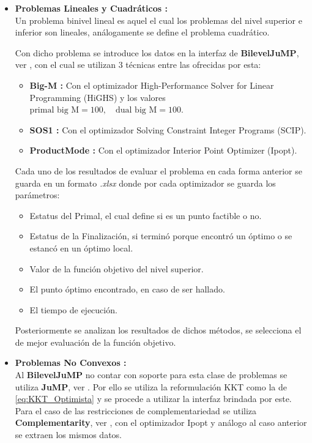 \begin{itemize}
    \item \textbf{Problemas Lineales y Cuadráticos :}\\
            Un problema binivel lineal es aquel el cual los problemas del nivel superior e inferior son lineales, análogamente se define el problema cuadrático.
            
            Con dicho problema se introduce los datos en la interfaz de \textbf{BilevelJuMP}, ver \cite{BilevelJump}, con el cual se utilizan 3 técnicas entre las ofrecidas por esta:
            \begin{itemize}
                \item \textbf{Big-M :} Con el optimizador High-Performance Solver for Linear Programming (HiGHS) y los valores $\text{primal big M} = 100, \quad \text{dual big M} = 100$.
                \item \textbf{SOS1 :} Con el optimizador Solving Constraint Integer Programs (SCIP).
                \item \textbf{ProductMode :} Con el optimizador Interior Point Optimizer (Ipopt).
            \end{itemize} 
            Cada uno de los resultados de evaluar el problema en cada forma anterior se guarda en un formato \textit{.xlsx}
            donde por cada optimizador se guarda los parámetros:
            \begin{itemize}
                \item Estatus del Primal, el cual define si es un punto factible o no.
                \item Estatus de la Finalización, si terminó porque encontró un óptimo o se estancó en un óptimo local.
                \item Valor de la función objetivo del nivel superior.
                \item El punto óptimo encontrado, en caso de ser hallado.
                \item El tiempo de ejecución.
            \end{itemize} 
            Posteriormente se analizan los resultados de dichos métodos, se selecciona el de mejor evaluación de la función objetivo.
    \item \textbf{Problemas No Convexos :}\\
            Al \textbf{BilevelJuMP} no contar con soporte para esta clase de problemas se utiliza \textbf{JuMP}, ver \cite{JuMPPaper}.
            Por ello se utiliza la reformulación KKT como la de \ref{eq:KKT_Optimista} y se procede a utilizar la interfaz brindada por este. Para el caso de las restricciones de 
            complementariedad se utiliza \textbf{Complementarity}, ver \cite{Complementarityjl}, con el optimizador Ipopt y análogo al caso anterior se extraen los mismos datos.
\end{itemize}


